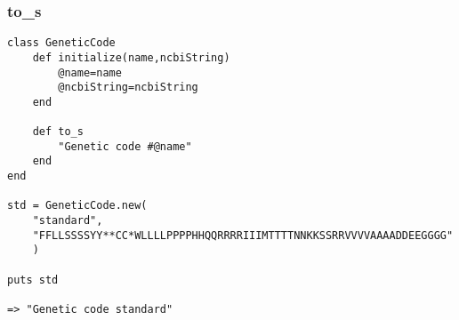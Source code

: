 \documentclass{article}
\begin{document}
\subsubsection{to\_s}
\begin{lstlisting}
class GeneticCode
	def initialize(name,ncbiString)
		@name=name
		@ncbiString=ncbiString
	end
	
	def to_s
		"Genetic code #@name"
	end
end

std = GeneticCode.new(
	"standard",
	"FFLLSSSSYY**CC*WLLLLPPPPHHQQRRRRIIIMTTTTNNKKSSRRVVVVAAAADDEEGGGG"
	)

puts std

=> "Genetic code standard"
\end{lstlisting}
\end{document}
